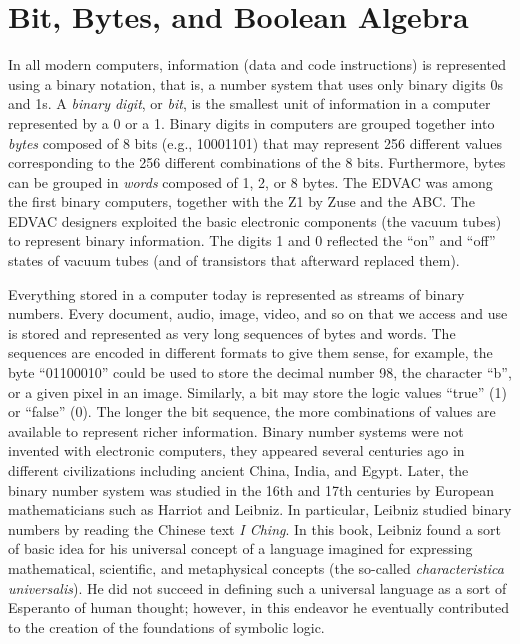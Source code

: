 \section{\label{sec:2.3}Bit, Bytes, and Boolean Algebra}
In all modern computers, information (data and code instructions) is represented using a binary notation, that is, a number system that uses only binary digits 0s and 1s. A \textit{binary digit}, or \textit{bit}, is the smallest unit of information in a computer represented by a 0 or a 1. Binary digits in computers are grouped together into \textit{bytes} composed of 8 bits (e.g., 10001101) that may represent 256 different values corresponding to the 256 different combinations of the 8 bits. Furthermore, bytes can be grouped in \textit{words} composed of 1, 2, or 8 bytes. The EDVAC was among the first binary computers, together with the Z1 by Zuse and the ABC. The EDVAC designers exploited the basic electronic components (the vacuum tubes) to represent binary information. The digits 1 and 0 reflected the ``on'' and ``off'' states of vacuum tubes (and of transistors that afterward\vadjust{\vspace*{-6pt}\pagebreak} replaced them).

Everything stored in a computer today is represented as streams of binary numbers. Every document, audio, image, video, and so on that we access and use is stored and represented as very long sequences of bytes and words. The sequences are encoded in different formats to give them sense, for example, the byte ``01100010'' could be used to store the decimal number 98, the character ``b'', or a given pixel in an image. Similarly, a bit may store the logic values ``true'' (1) or ``false'' (0). The longer the bit sequence, the more combinations of values are available to represent richer information. Binary number systems were not invented with electronic computers, they appeared several centuries ago in different civilizations including ancient China, India, and Egypt. Later, the binary number system was studied in the 16th and 17th centuries by European mathematicians such as Harriot and Leibniz. In particular, Leibniz studied binary numbers by reading the Chinese text \textit{I Ching}. In this book, Leibniz found a sort of basic idea for his universal concept of a language imagined for expressing mathematical, scientific, and metaphysical concepts (the so-called \textit{characteristica universalis}). He did not succeed in defining such a \hbox{universal} language as a sort of Esperanto of human thought; however, in this endeavor he eventually contributed to the creation of the foundations of symbolic logic.

